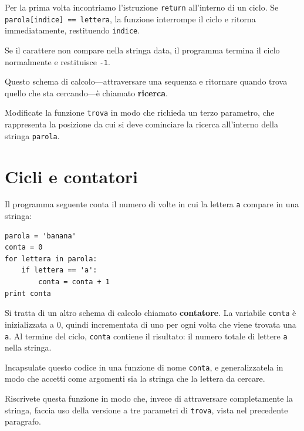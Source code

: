 \documentclass[10pt]{book}
\begin{document}
Per la prima volta incontriamo l'istruzione {\tt return} all'interno di un ciclo. Se {\tt parola[indice] == lettera}, la funzione interrompe il ciclo e ritorna immediatamente, restituendo {\tt indice}. 

Se il carattere non compare nella stringa data, il programma termina il ciclo  normalmente e restituisce {\tt -1}.

Questo schema di calcolo---attraversare una sequenza e ritornare quando trova quello che sta cercando---è chiamato {\bf ricerca}.

\vspace{0.2in}
\begin{exercise}

Modificate la funzione {\tt trova} in modo che richieda un terzo parametro, che rappresenta la posizione da cui si deve cominciare la ricerca all'interno della stringa {\tt parola}.

\end{exercise}


\section{Cicli e contatori}
\label{counter}

Il programma seguente conta il numero di volte in cui la lettera {\tt a}
compare in una stringa:

\begin{verbatim}
parola = 'banana'
conta = 0
for lettera in parola:
    if lettera == 'a':
        conta = conta + 1
print conta
\end{verbatim}
%
Si tratta di un altro schema di calcolo chiamato  {\bf contatore}.  La variabile {\tt conta} è inizializzata a 0, quindi incrementata di uno per ogni volta che viene trovata una {\tt a}.
Al termine del ciclo, {\tt conta} contiene il risultato: il numero totale di lettere {\tt a} nella stringa.

\vspace{0.2in}
\begin{exercise}

Incapsulate questo codice in una funzione di nome {\tt conta}, e generalizzatela in modo che accetti come argomenti sia la stringa che la lettera da cercare.
\end{exercise}

\vspace{0.2in}
\begin{exercise}

Riscrivete questa funzione in modo che, invece di attraversare completamente la stringa, faccia uso della versione a tre parametri di {\tt trova}, vista nel precedente paragrafo.

\end{exercise}
\end{document}
